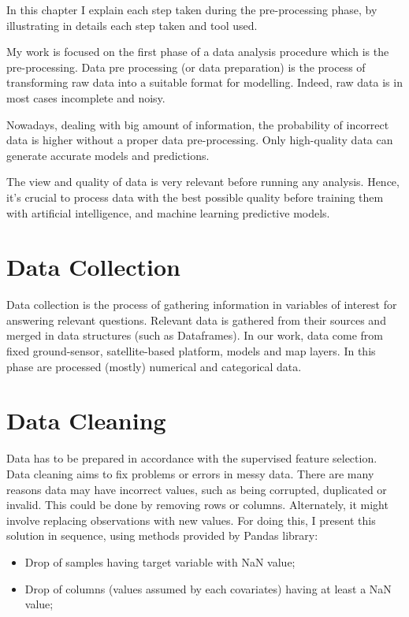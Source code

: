In this chapter I explain each step taken during the pre-processing phase, by illustrating in details each step taken and tool used. \newline
\par
My work is focused on the first phase of a data analysis procedure which is the pre-processing.
Data pre processing (or data preparation) is the process of transforming raw data into a suitable format for modelling. 
Indeed, raw data is in most cases incomplete and noisy.\par
Nowadays, dealing with big amount of information, the probability of incorrect data is higher without a proper data pre-processing.
Only high-quality data can generate accurate models and predictions. \par
The view and quality of data is very relevant before running any analysis.
Hence, it’s crucial to process data with the best possible quality before training them with artificial intelligence, and machine learning predictive models.\par
\section{Data Collection}
Data collection is the process of gathering information in variables of interest for answering relevant questions. \newline
Relevant data is gathered from their sources and merged in data structures (such as Dataframes). In our work, data come from fixed ground-sensor, satellite-based platform, models and map layers. In this phase are processed (mostly) numerical and categorical data. 
\section{Data Cleaning}
\label{sec:Data cleaning}
Data has to be prepared in accordance with the supervised feature selection.
Data cleaning aims to fix problems or errors in messy data. There are many reasons data may have incorrect values, such as being corrupted, duplicated or invalid. \newline
This could be done by removing rows or columns. Alternately, it might involve replacing observations with new values. \newline
For doing this, I present this solution in sequence, using methods provided by Pandas library:
\begin{itemize}
\item Drop of samples having target variable with NaN value;
\item Drop of columns (values assumed by each covariates) having at least a NaN value;
\end{itemize}
